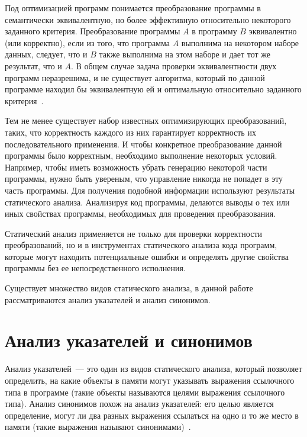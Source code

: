 \documentclass[14pt,titlepage]{extarticle}
\let\oldsection\section
\renewcommand{\section}{\newpage\oldsection}
\begin{document}
    Под оптимизацией программ понимается преобразование программы в
    семантически эквивалентную, но более эффективную относительно некоторого
    заданного критерия.
    Преобразование программы $A$ в программу $B$ эквивалентно (или корректно),
    если из того, что программа $A$ выполнима на некотором наборе данных,
    следует, что и $B$ также выполнима на этом наборе и дает тот же результат,
    что и $A$.
    В общем случае задача проверки эквивалентности двух программ неразрешима,
    и не существует алгоритма, который по данной программе находил бы
    эквивалентную ей и оптимальную относительно заданного
    критерия~\cite{kasjanov_translators}.

    Тем не менее существует набор известных оптимизирующих преобразований,
    таких, что корректность каждого из них гарантирует корректность их
    последовательного применения.
    И чтобы конкретное преобразование данной программы было корректным,
    необходимо выполнение некоторых условий. Например, чтобы иметь
    возможность убрать генерацию некоторой части программы, нужно быть
    увереным, что управление никогда не попадет в эту часть программы.
    Для получения подобной информации используют результаты статического
    анализа. Анализируя код программы, делаются выводы о тех или иных свойствах
    программы, необходимых для проведения преобразования.

    Статический анализ применяется не только для проверки
    корректности преобразований, но и в инструментах статического анализа
    кода программ, которые могут находить потенциальные ошибки и определять
    другие свойства программы без ее непосредственного исполнения.

    Существует множество видов статического анализа, в данной работе
    рассматриваются анализ указателей и анализ синонимов.

  \section{Анализ указателей и синонимов}

    Анализ указателей~--- это один из видов статического анализа, который
    позволяет определить, на какие объекты в памяти могут указывать выражения
    ссылочного типа в программе (такие объекты называются целями выражения
    ссылочного типа). Анализ синонимов похож на анализ указателей: его целью
    является определение, могут ли два разных выражения ссылаться на одно и
    то же место в памяти (такие выражения называют синонимами)~\cite{andersen}.
\end{document}
